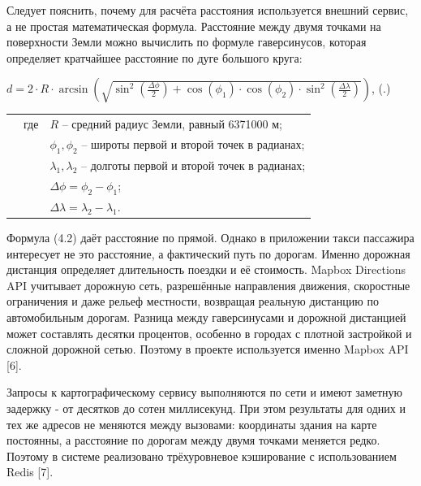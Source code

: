 {  \par \redline Следует пояснить, почему для расчёта расстояния используется внешний сервис, а не простая математическая формула. Расстояние между двумя точками на поверхности Земли можно вычислить по формуле гаверсинусов, которая определяет кратчайшее расстояние по дуге большого круга:

  \formulaspace \par \redline
    $d = 2 \cdot R \cdot \arcsin\left(\sqrt{\sin^2\left(\frac{\Delta\phi}{2}\right) +
    \cos(\phi_1) \cdot \cos(\phi_2) \cdot \sin^2\left(\frac{\Delta\lambda}{2}\right)}\right)$,
    \hfill (\thechaptercntr .\theformulacntr) \redline
  \formulaspace \addtocounter{formulacntr}{1}

  \begin{tabular}{p{}p{}p{}}
    & где  & $R$ {--} средний радиус Земли, равный 6371000 м; \\
    &      & $\phi_1, \phi_2$ {--} широты первой и второй точек в радианах; \\
    &      & $\lambda_1, \lambda_2$ {--} долготы первой и второй точек в радианах; \\
    &      & $\Delta\phi = \phi_2 - \phi_1$; \\
    &      & $\Delta\lambda = \lambda_2 - \lambda_1$. \\
  \end{tabular}

  \par \redline Формула (4.2) даёт расстояние по прямой. Однако в приложении такси пассажира интересует не это расстояние, а фактический путь по дорогам. Именно дорожная дистанция определяет длительность поездки и её стоимость. Mapbox Directions API учитывает дорожную сеть, разрешённые направления движения, скоростные ограничения и даже рельеф местности, возвращая реальную дистанцию по автомобильным дорогам. Разница между гаверсинусами и дорожной дистанцией может составлять десятки процентов, особенно в городах с плотной застройкой и сложной дорожной сетью. Поэтому в проекте используется именно Mapbox API [6].

  \par \redline Запросы к картографическому сервису выполняются по сети и имеют заметную задержку - от десятков до сотен миллисекунд. При этом результаты для одних и тех же адресов не меняются между вызовами: координаты здания на карте постоянны, а расстояние по дорогам между двумя точками меняется редко. Поэтому в системе реализовано трёхуровневое кэширование с использованием Redis [7].

}
